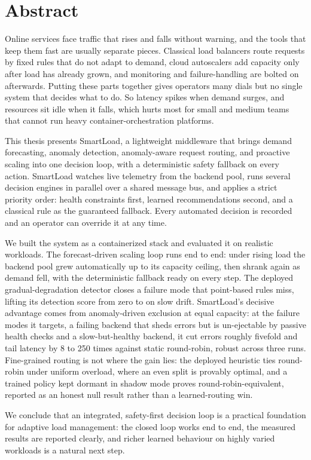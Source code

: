 \chapter*{Abstract}

Online services face traffic that rises and falls without warning, and the
tools that keep them fast are usually separate pieces. Classical load balancers
route requests by fixed rules that do not adapt to demand, cloud autoscalers add
capacity only after load has already grown, and monitoring and failure-handling
are bolted on afterwards. Putting these parts together gives operators many
dials but no single system that decides what to do. So latency spikes when
demand surges, and resources sit idle when it falls, which hurts most for small
and medium teams that cannot run heavy container-orchestration platforms.

This thesis presents SmartLoad, a lightweight middleware that brings demand
forecasting, anomaly detection, anomaly-aware request routing, and proactive
scaling into one decision loop, with a deterministic safety fallback on every action. SmartLoad
watches live telemetry from the backend pool, runs several decision engines in
parallel over a shared message bus, and applies a strict priority order: health
constraints first, learned recommendations second, and a classical rule as the
guaranteed fallback. Every automated decision is recorded and an operator can
override it at any time.

We built the system as a containerized stack and evaluated it on realistic
workloads. The forecast-driven scaling loop runs end to end: under rising load
the backend pool grew automatically up to its capacity ceiling, then shrank
again as demand fell, with the deterministic fallback ready on every step.
The deployed gradual-degradation detector closes a failure mode that point-based
rules miss, lifting its detection score from zero to \BManFone{} on slow drift.
SmartLoad's decisive advantage comes from anomaly-driven exclusion at equal capacity:
at the failure modes it targets, a failing backend that sheds errors but is
un-ejectable by passive health checks and a slow-but-healthy backend, it cut errors
roughly fivefold and tail latency by 8 to 250 times against static round-robin, robust
across three runs. Fine-grained routing is not where the gain lies: the deployed
heuristic ties round-robin under uniform overload, where an even split is provably
optimal, and a trained policy kept dormant in shadow mode proves round-robin-equivalent,
reported as an honest null result rather than a learned-routing win.

We conclude that an integrated, safety-first decision loop is a practical
foundation for adaptive load management: the closed loop works end to end, the
measured results are reported clearly, and richer learned behaviour on highly
varied workloads is a natural next step.

\clearpage
